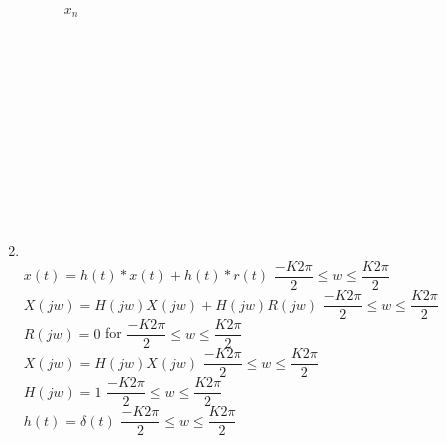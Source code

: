 \documentclass[10pt,a4paper, margin=1in]{article}
\begin{document}
\begin{enumerate}
\begin{figure}[h!]
\begin{tikzpicture}[scale=1.1]
		\end{tikzpicture}
		\caption{$x_n$}
		\label{fig:q1}
	\end{figure}\\
\ \\
\ \\
\ \\
\ \\
\ \\
\ \\
\ \\
\ \\
\ \\
\item  
\ \\
$x(t) = h(t)*x(t)+h(t)*r(t)$ \quad \qquad $\dfrac{-K2\pi}{2} \le w \le \dfrac{K2\pi}{2}$ \\
$X(jw) = H(jw)X(jw) + H(jw)R(jw)$   \quad \qquad $\dfrac{-K2\pi}{2} \le w \le \dfrac{K2\pi}{2}$\\
$R(jw)=0$  for $ \dfrac{-K2\pi}{2} \le w \le \dfrac{K2\pi}{2} $\\
$X(jw) = H(jw)X(jw)$  \quad \qquad $\dfrac{-K2\pi}{2} \le w \le \dfrac{K2\pi}{2}$ \\
$H(jw)=1$  \quad \qquad $\dfrac{-K2\pi}{2} \le w \le \dfrac{K2\pi}{2}$ \\
$h(t) = \delta(t) $  \quad \qquad $\dfrac{-K2\pi}{2} \le w \le \dfrac{K2\pi}{2}$ \\



\end{enumerate}
\end{document}

